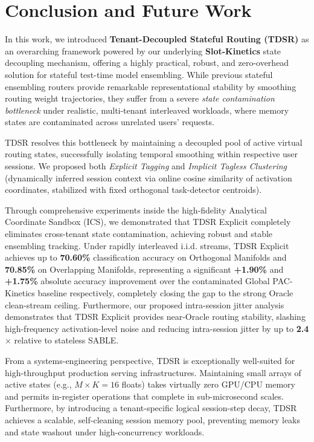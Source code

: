 \section{Conclusion and Future Work}
\label{sec:conclusion}

In this work, we introduced \textbf{Tenant-Decoupled Stateful Routing (TDSR)} as an overarching framework powered by our underlying \textbf{Slot-Kinetics} state decoupling mechanism, offering a highly practical, robust, and zero-overhead solution for stateful test-time model ensembling. While previous stateful ensembling routers provide remarkable representational stability by smoothing routing weight trajectories, they suffer from a severe \emph{state contamination bottleneck} under realistic, multi-tenant interleaved workloads, where memory states are contaminated across unrelated users' requests.

TDSR resolves this bottleneck by maintaining a decoupled pool of active virtual routing states, successfully isolating temporal smoothing within respective user sessions. We proposed both \emph{Explicit Tagging} and \emph{Implicit Tagless Clustering} (dynamically inferred session context via online cosine similarity of activation coordinates, stabilized with fixed orthogonal task-detector centroids).

Through comprehensive experiments inside the high-fidelity Analytical Coordinate Sandbox (ICS), we demonstrated that TDSR Explicit completely eliminates cross-tenant state contamination, achieving robust and stable ensembling tracking. Under rapidly interleaved i.i.d. streams, TDSR Explicit achieves up to \textbf{70.60\%} classification accuracy on Orthogonal Manifolds and \textbf{70.85\%} on Overlapping Manifolds, representing a significant \textbf{+1.90\%} and \textbf{+1.75\%} absolute accuracy improvement over the contaminated Global PAC-Kinetics baseline respectively, completely closing the gap to the strong Oracle clean-stream ceiling. Furthermore, our proposed intra-session jitter analysis demonstrates that TDSR Explicit provides near-Oracle routing stability, slashing high-frequency activation-level noise and reducing intra-session jitter by up to \textbf{2.4$\times$} relative to stateless SABLE.

From a systems-engineering perspective, TDSR is exceptionally well-suited for high-throughput production serving infrastructures. Maintaining small arrays of active states (e.g., $M \times K = 16$ floats) takes virtually zero GPU/CPU memory and permits in-register operations that complete in sub-microsecond scales. Furthermore, by introducing a tenant-specific logical session-step decay, TDSR achieves a scalable, self-cleaning session memory pool, preventing memory leaks and state washout under high-concurrency workloads.

